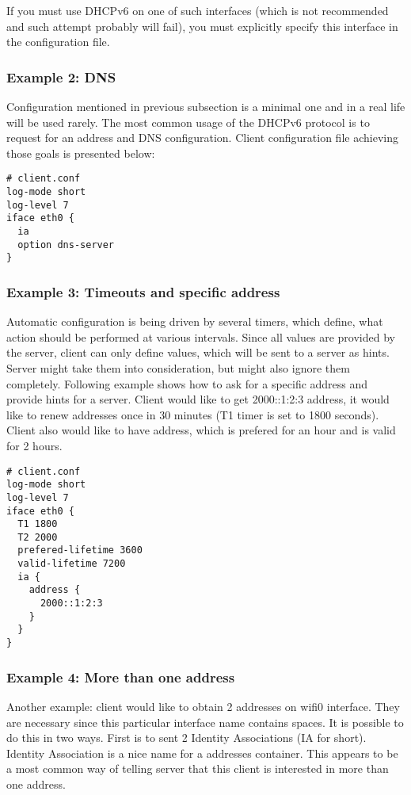 If you must use DHCPv6 on one of such interfaces (which is not
recommended and such attempt probably will fail), you must explicitly
specify this interface in the configuration file.

\subsubsection{Example 2: DNS}
Configuration mentioned in previous subsection is a minimal one and in a
real life will be used rarely. The most common usage of the DHCPv6
protocol is to request for an address and DNS configuration. Client
configuration file achieving those goals is presented below:
\begin{lstlisting}
# client.conf
log-mode short
log-level 7
iface eth0 {
  ia
  option dns-server
}
\end{lstlisting}

\subsubsection{Example 3: Timeouts and specific address}

Automatic configuration is being driven by several timers, which define,
what action should be performed at various intervals. Since all
values are provided by the server, client can only define values, which
will be sent to a server as hints. Server might take them into
consideration, but might also ignore them
completely. Following example shows how to ask for a specific address
and provide hints for a server. Client would like to get 2000::1:2:3
address, it would like to renew addresses once in 30 minutes (T1 timer
is set to 1800 seconds). Client also would like to have address, which
is prefered for an hour and is valid for 2 hours. 

\begin{lstlisting}
# client.conf
log-mode short
log-level 7
iface eth0 {
  T1 1800
  T2 2000
  prefered-lifetime 3600
  valid-lifetime 7200
  ia {
    address { 
      2000::1:2:3
    }
  }
}
\end{lstlisting}

\subsubsection{Example 4: More than one address}

Another example: client would like to obtain 2 addresses on
wifi0 interface. They are necessary since this particular interface name
contains spaces. It is possible to do this in two ways. First is to
sent 2 Identity Associations (IA for short). Identity Association is a
nice name for a addresses container. This appears to be a most common
way of telling server that this client is interested in more than one
address. 

